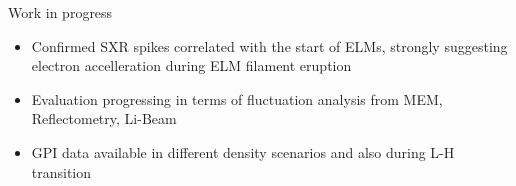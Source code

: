 \documentclass[10pt, compress]{beamer}
\begin{document}
\begin{frame}{Work in progress}
  \begin{itemize}
    \item Confirmed SXR spikes correlated with the start of ELMs,
      strongly suggesting electron accelleration during ELM filament
      eruption
    \item Evaluation progressing in terms of fluctuation analysis from
      MEM, Reflectometry, Li-Beam
    \item GPI data available in different density scenarios and also
      during L-H transition
  \end{itemize}
\end{frame}
\end{document}
